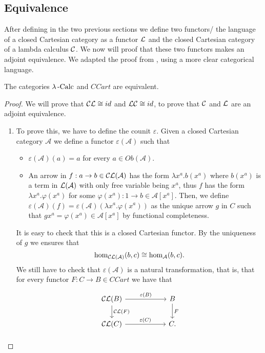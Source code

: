 \subsection{Equivalence}
After defining in the two previous sections we define two functors/ the language of a closed Cartesian category as a functor $\mathcal{L}$ and the closed Cartesian category of a lambda calculus $\mathcal{C}$. We now will proof that these two functors makes an adjoint equivalence. We adapted the proof from \cite[Theorem 11.3]{lambek1988introduction}, using a more clear categorical language. 


\begin{theorem}The categories $\lambda\operatorname{-Calc}$ and $CCart$ are equivalent. \end{theorem}
\begin{proof}
  We will prove that $\mathcal{C} \mathcal{L} \cong id$ and  $ \mathcal{L}\mathcal{C} \cong id$, to prove that $\mathcal{C}$ and $\mathcal{L}$ are an adjoint equivalence.

  \begin{enumerate}
  \item[\fbox{$\CC \LL \cong 1_{\mathcal A}$}] To prove this, we have to define the counit $\varepsilon$. Given a closed Cartesian category $\mathcal A$ we define a functor  $\varepsilon(\mathcal A)$ such that
    \begin{itemize}
    \item $\varepsilon(\mathcal A)    (a) = a$ for every $a\in Ob(\mathcal A)$.
    \item An arrow in $f:a\to b \in \mathcal{C} \mathcal{L}(\mathcal A)$ has the form $\lambda x^a. b(x^a)$ where $b(x^a)$ is a term in $\mathcal{L} (\mathcal A)$ with only free variable being $x^a$, thus $f$ has the form $\lambda x^a. \varphi(x^a)$ for some $\varphi(x^a): 1 \to b \in \mathcal A [x^a]$. Then, we define $\varepsilon(\mathcal A)(f) = \varepsilon(\mathcal A)(\lambda x^a.\varphi(x^a))$ as the unique arrow $g$ in $C$ such that $gx^a = \varphi(x^a) \in \mathcal A[x^a]$ by functional completeness.
    \end{itemize}
    It is easy to check that this is a closed Cartesian functor.  By the uniqueness of $g$ we ensures that $$\operatorname{hom}_{\mathcal{C}\mathcal{L}(\mathcal A)} (b,c)\cong \operatorname{hom}_{\mathcal A} (b,c).$$
    We still have to check that $\varepsilon (\mathcal A)$ is a natural transformation, that is, that for every functor $F: C\to B\in CCart$ we have that
    \[
      \begin{tikzpicture}
        \node {\begin{tikzcd}[column sep=20mm]
            \CC\LL(B)\ar[r,"\varepsilon(B)"]\ar[d,"\CC\LL(F)"] & B\ar[d,"F"]\\
            \CC\LL(C)\ar[r,"\varepsilon(C)"] & C.
          \end{tikzcd}};
      \end{tikzpicture}
    \]


\end{enumerate}
\end{proof}
